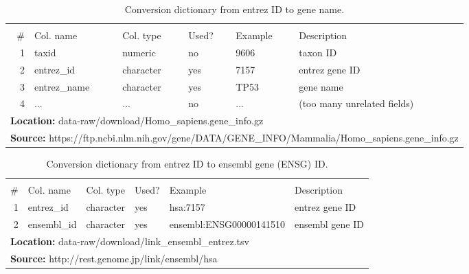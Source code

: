 \begin{table}[H]

\caption{\label{tab:entrez_names}Conversion dictionary from entrez ID to gene name.}
\begin{tabular}[t]{rlllll}
\toprule
\multicolumn{6}{c}{\bgroup\fontsize{12}{14}\selectfont \cellcolor[HTML]{EEEEEE}{\ttfamily{\textbf{entrez\_names}}}\egroup{}} \\
\cmidrule(l{3pt}r{3pt}){1-6}
\# & Col. name & Col. type & Used? & Example & Description\\
\midrule
\rowcolor{gray!6}  1 & taxid & numeric & no & 9606 & taxon ID\\
2 & entrez\_id & character & yes & 7157 & entrez gene ID\\
\rowcolor{gray!6}  3 & entrez\_name & character & yes & TP53 & gene name\\
4 & ... & ... & no & ... & (too many unrelated fields)\\
\bottomrule
\multicolumn{6}{l}{\textbf{Location: } data-raw/download/Homo\_sapiens.gene\_info.gz}\\
\multicolumn{6}{l}{\textbf{Source: } https://ftp.ncbi.nlm.nih.gov/gene/DATA/GENE\_INFO/Mammalia/Homo\_sapiens.gene\_info.gz}\\
\end{tabular}
\end{table}
\begin{table}[H]

\caption{\label{tab:link_ensembl_entrez}Conversion dictionary from entrez ID to ensembl gene (ENSG) ID.}
\begin{tabular}[t]{rlllll}
\toprule
\multicolumn{6}{c}{\bgroup\fontsize{12}{14}\selectfont \cellcolor[HTML]{EEEEEE}{\ttfamily{\textbf{link\_ensembl\_entrez}}}\egroup{}} \\
\cmidrule(l{3pt}r{3pt}){1-6}
\# & Col. name & Col. type & Used? & Example & Description\\
\midrule
\rowcolor{gray!6}  1 & entrez\_id & character & yes & hsa:7157 & entrez gene ID\\
2 & ensembl\_id & character & yes & ensembl:ENSG00000141510 & ensembl gene ID\\
\bottomrule
\multicolumn{6}{l}{\textbf{Location: } data-raw/download/link\_ensembl\_entrez.tsv}\\
\multicolumn{6}{l}{\textbf{Source: } http://rest.genome.jp/link/ensembl/hsa}\\
\end{tabular}
\end{table}

